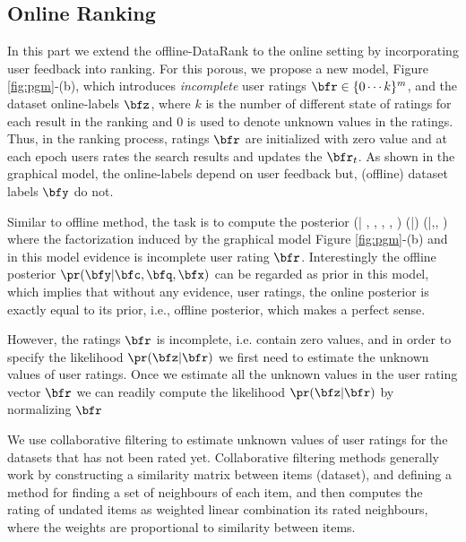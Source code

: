 \documentclass[twoside,11pt]{article}
\begin{document}
\subsection{Online Ranking}
In this part we extend the offline-DataRank to the online setting by incorporating user feedback into ranking. For this porous, we propose a new model, Figure \ref{fig:pgm}-(b), which introduces \emph{incomplete} user ratings $\bfr\in \{0\cdots k \}^{m}$, and the dataset online-labels $\bfz$, where $k$ is the number of different state of ratings for each result in the ranking and 0 is used to denote unknown values in the ratings. Thus, in the ranking process, ratings $\bfr$ are initialized with zero value and at each epoch users rates the search results and updates the $\bfr_t$. As shown in the graphical model, the online-labels depend on user feedback but, (offline) dataset labels $\bfy$ do not. 

 Similar to offline method, the task is to compute the posterior
\beq \label{eq:online-posterior}
\pr (\bfz | \bfr, \bfy, \bfc, \bfq, \bfx)  \propto  \pr (\bfz |\bfr) \pr (\bfy |\bfc,\bfq, \bfx)
\eeq
where the factorization induced by the graphical model Figure \ref{fig:pgm}-(b) and in this model evidence is incomplete user rating $\bfr$. Interestingly the offline posterior $\pr (\bfy |\bfc,\bfq, \bfx)$ can be regarded as prior in this model, which implies that without any evidence, user ratings, the online posterior is exactly equal to its prior, i.e., offline posterior, which makes a perfect sense.

However, the ratings $\bfr$ is incomplete, i.e. contain zero values, and in order to specify the likelihood $\pr (\bfz |\bfr)$ we first need to estimate the unknown values of user ratings. Once we estimate all the unknown values in the user rating vector $\bfr$  we can readily  compute the likelihood $\pr (\bfz |\bfr)$ by normalizing $\bfr$

We use collaborative filtering \cite{CF-survey} to estimate unknown values of user ratings for the datasets that has not been rated yet. Collaborative filtering methods generally work by constructing a similarity matrix between items (dataset), and defining a method for finding a set of neighbours of each item, and then computes the rating of undated items as weighted linear combination its rated neighbours, where the weights are proportional to similarity between items.
\end{document}
